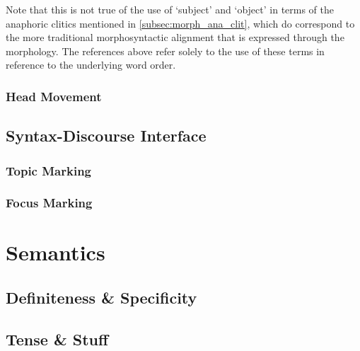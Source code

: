 \documentclass[a4paper,11pt,oneside,openany]{memoir}
\begin{document}
Note that this is not true of the use of `subject' and `object' in terms of the anaphoric clitics mentioned in \autoref{subsec:morph_ana_clit}, which do correspond to the more traditional morphosyntactic alignment that is expressed through the morphology. The references above refer solely to the use of these terms in reference to the underlying word order.

\subsection{Head Movement}

\section{Syntax-Discourse Interface}

\subsection{Topic Marking}

\subsection{Focus Marking}

\chapter{Semantics}

\section{Definiteness \& Specificity}\label{sec:spec-def}

\section{Tense \& Stuff}\label{sec:tense}



\end{document}
